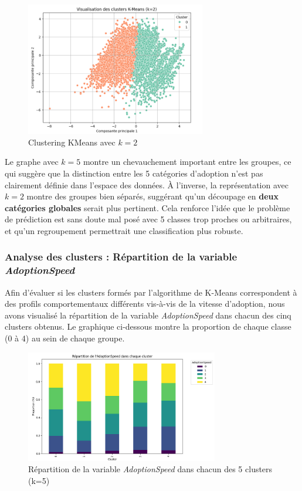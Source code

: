 \documentclass[a4paper,12pt]{article}
\begin{document}
\begin{figure}[H]
    \centering
    \includegraphics[width=0.7\textwidth]{graph_kmeans_2.png}
    \caption{Clustering KMeans avec $k=2$}
    \label{fig:kmeans_2}
\end{figure}

Le graphe avec $k=5$ montre un chevauchement important entre les groupes, ce qui suggère que la distinction entre les 5 catégories d’adoption n’est pas clairement définie dans l’espace des données. À l’inverse, la représentation avec $k=2$ montre des groupes bien séparés, suggérant qu’un découpage en \textbf{deux catégories globales} serait plus pertinent. Cela renforce l’idée que le problème de prédiction est sans doute mal posé avec 5 classes trop proches ou arbitraires, et qu’un regroupement permettrait une classification plus robuste.

\subsubsection{Analyse des clusters : Répartition de la variable \textit{AdoptionSpeed}}

Afin d’évaluer si les clusters formés par l’algorithme de K-Means correspondent à des profils comportementaux différents vis-à-vis de la vitesse d’adoption, nous avons visualisé la répartition de la variable \textit{AdoptionSpeed} dans chacun des cinq clusters obtenus. Le graphique ci-dessous montre la proportion de chaque classe (0 à 4) au sein de chaque groupe.

\begin{figure}[H]
    \centering
    \includegraphics[width=0.75\textwidth]{repartition_de_adoptionspeed.png}
    \caption{Répartition de la variable \textit{AdoptionSpeed} dans chacun des 5 clusters (k=5)}
    \label{fig:cluster_adoption_split}
\end{figure}
\end{document}
